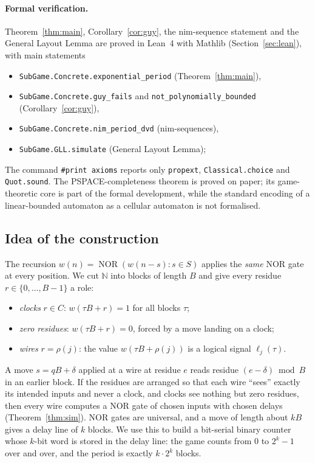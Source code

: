 \documentclass[11pt]{article}
\theoremstyle{definition}
\newcommand{\N}{\mathbb{N}}
\newcommand{\NOR}{\operatorname{NOR}}
\begin{document}
\paragraph{Formal verification.}  Theorem~\ref{thm:main}, Corollary~\ref{cor:guy}, the nim-sequence statement
and the General Layout Lemma are proved in Lean~4 with Mathlib (Section~\ref{sec:lean}), with main statements
\begin{itemize}
\item \texttt{SubGame.Concrete.exponential\_period} (Theorem~\ref{thm:main}),
\item \texttt{SubGame.Concrete.guy\_fails} and \texttt{not\_polynomially\_bounded} (Corollary~\ref{cor:guy}),
\item \texttt{SubGame.Concrete.nim\_period\_dvd} (nim-sequences),
\item \texttt{SubGame.GLL.simulate} (General Layout Lemma);
\end{itemize}
{\sloppy The command \texttt{\#print axioms} reports only \texttt{propext}, \texttt{Classical.choice} and \texttt{Quot.sound}.
The PSPACE-completeness theorem is proved on paper; its game-theoretic core is part of the formal
development, while the standard encoding of a linear-bounded automaton as a cellular automaton is not
formalised.\par}

\subsection{Idea of the construction}

The recursion $w(n)=\NOR(w(n-s):s\in S)$ applies the \emph{same} NOR gate at every position.  We
cut $\N$ into blocks of length $B$ and give every residue $r\in\{0,\dots,B-1\}$ a role:
\begin{itemize}
\item \emph{clocks} $r\in C$: $w(\tau B+r)=1$ for all blocks $\tau$;
\item \emph{zero residues}: $w(\tau B+r)=0$, forced by a move landing on a clock;
\item \emph{wires} $r=\rho(j)$: the value $w(\tau B+\rho(j))$ is a logical signal $\ell_j(\tau)$.
\end{itemize}
A move $s=qB+\delta$ applied at a wire at residue $e$ reads residue $(e-\delta)\bmod B$ in an earlier
block.  If the residues are arranged so that each wire ``sees'' exactly its intended inputs and never a
clock, and clocks see nothing but zero residues, then every wire computes a NOR gate of chosen
inputs with chosen delays (Theorem~\ref{thm:sim}).  NOR gates are universal, and a move of length
about $kB$ gives a delay line of $k$ blocks.  We use this to build a bit-serial binary counter
whose $k$-bit word is stored in the delay line: the game counts from $0$ to $2^k-1$ over and over,
and the period is exactly $k\cdot 2^k$ blocks.
\end{document}
